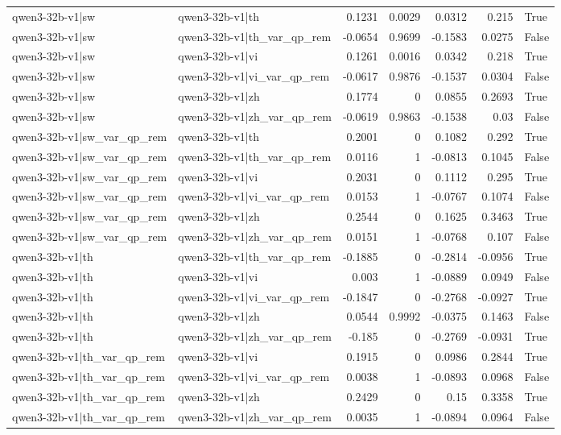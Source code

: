 \begin{table}
\begin{tabular}{l l r r r r l}
qwen3-32b-v1|sw & qwen3-32b-v1|th & 0.1231 & 0.0029 & 0.0312 & 0.215 & True \\
qwen3-32b-v1|sw & qwen3-32b-v1|th_var_qp_rem & -0.0654 & 0.9699 & -0.1583 & 0.0275 & False \\
qwen3-32b-v1|sw & qwen3-32b-v1|vi & 0.1261 & 0.0016 & 0.0342 & 0.218 & True \\
qwen3-32b-v1|sw & qwen3-32b-v1|vi_var_qp_rem & -0.0617 & 0.9876 & -0.1537 & 0.0304 & False \\
qwen3-32b-v1|sw & qwen3-32b-v1|zh & 0.1774 & 0 & 0.0855 & 0.2693 & True \\
qwen3-32b-v1|sw & qwen3-32b-v1|zh_var_qp_rem & -0.0619 & 0.9863 & -0.1538 & 0.03 & False \\
qwen3-32b-v1|sw_var_qp_rem & qwen3-32b-v1|th & 0.2001 & 0 & 0.1082 & 0.292 & True \\
qwen3-32b-v1|sw_var_qp_rem & qwen3-32b-v1|th_var_qp_rem & 0.0116 & 1 & -0.0813 & 0.1045 & False \\
qwen3-32b-v1|sw_var_qp_rem & qwen3-32b-v1|vi & 0.2031 & 0 & 0.1112 & 0.295 & True \\
qwen3-32b-v1|sw_var_qp_rem & qwen3-32b-v1|vi_var_qp_rem & 0.0153 & 1 & -0.0767 & 0.1074 & False \\
qwen3-32b-v1|sw_var_qp_rem & qwen3-32b-v1|zh & 0.2544 & 0 & 0.1625 & 0.3463 & True \\
qwen3-32b-v1|sw_var_qp_rem & qwen3-32b-v1|zh_var_qp_rem & 0.0151 & 1 & -0.0768 & 0.107 & False \\
qwen3-32b-v1|th & qwen3-32b-v1|th_var_qp_rem & -0.1885 & 0 & -0.2814 & -0.0956 & True \\
qwen3-32b-v1|th & qwen3-32b-v1|vi & 0.003 & 1 & -0.0889 & 0.0949 & False \\
qwen3-32b-v1|th & qwen3-32b-v1|vi_var_qp_rem & -0.1847 & 0 & -0.2768 & -0.0927 & True \\
qwen3-32b-v1|th & qwen3-32b-v1|zh & 0.0544 & 0.9992 & -0.0375 & 0.1463 & False \\
qwen3-32b-v1|th & qwen3-32b-v1|zh_var_qp_rem & -0.185 & 0 & -0.2769 & -0.0931 & True \\
qwen3-32b-v1|th_var_qp_rem & qwen3-32b-v1|vi & 0.1915 & 0 & 0.0986 & 0.2844 & True \\
qwen3-32b-v1|th_var_qp_rem & qwen3-32b-v1|vi_var_qp_rem & 0.0038 & 1 & -0.0893 & 0.0968 & False \\
qwen3-32b-v1|th_var_qp_rem & qwen3-32b-v1|zh & 0.2429 & 0 & 0.15 & 0.3358 & True \\
qwen3-32b-v1|th_var_qp_rem & qwen3-32b-v1|zh_var_qp_rem & 0.0035 & 1 & -0.0894 & 0.0964 & False \\

\end{tabular}
\end{table}
